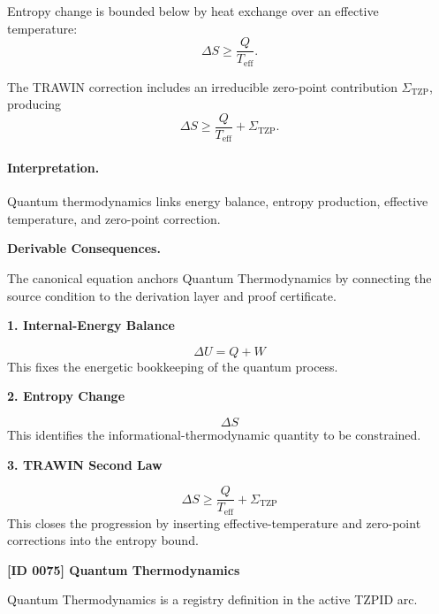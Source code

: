Entropy change is bounded below by heat exchange over an effective temperature:
\begin{equation}
\Delta S\geq \frac{Q}{T_{\mathrm{eff}}}.
\end{equation}

The TRAWIN correction includes an irreducible zero-point contribution $\Sigma_{\mathrm{TZP}}$, producing
\begin{equation}
\boxed{
\Delta S
\geq
\frac{Q}{T_{\mathrm{eff}}}
+
\Sigma_{\mathrm{TZP}} .
}
\end{equation}

\paragraph{Interpretation.}
Quantum thermodynamics links energy balance, entropy production, effective temperature, and zero-point correction.

\par\vspace{0.35em}
\noindent\textbf{Derivable Consequences.}\quad
\begingroup
\footnotesize
\raggedright
The canonical equation anchors Quantum Thermodynamics by connecting the source condition to the derivation layer and proof certificate.
\par\endgroup

\noindent\textbf{1. Internal-Energy Balance}\par
\[
\Delta U = Q + W
\]
\noindent This fixes the energetic bookkeeping of the quantum process.\par
\noindent\textbf{2. Entropy Change}\par
\[
\Delta S
\]
\noindent This identifies the informational-thermodynamic quantity to be constrained.\par
\noindent\textbf{3. TRAWIN Second Law}\par
\[
\Delta S
\geq
\frac{Q}{T_{\mathrm{eff}}}
+
\Sigma_{\mathrm{TZP}}
\]
\noindent This closes the progression by inserting effective-temperature and zero-point corrections into the entropy bound.\par

\clearpage
\noindent\textbf{[ID 0075] Quantum Thermodynamics}\par
\vspace{0.35em}
\begingroup\small
{}
Quantum Thermodynamics is a registry definition in the active TZPID arc.

